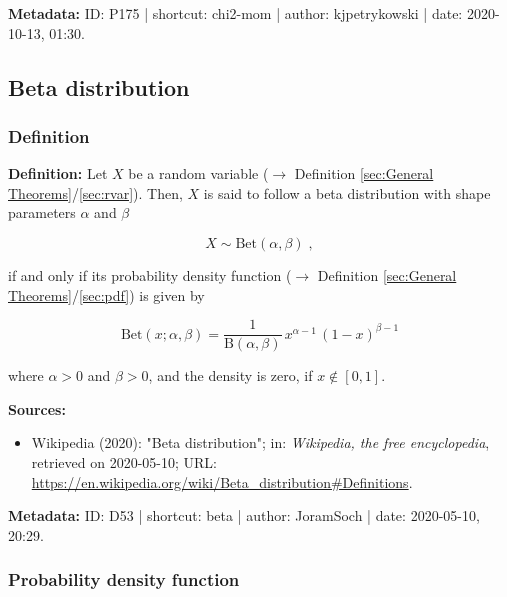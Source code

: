 \documentclass[a4paper,12pt,twoside]{book}
\begin{document}
\vspace{1em}
\textbf{Metadata:} ID: P175 | shortcut: chi2-mom | author: kjpetrykowski | date: 2020-10-13, 01:30.
\vspace{1em}



\subsection{Beta distribution}

\subsubsection[\textit{Definition}]{Definition} \label{sec:beta}
\setcounter{equation}{0}

\textbf{Definition:} Let $X$ be a random variable ($\rightarrow$ Definition \ref{sec:General Theorems}/\ref{sec:rvar}). Then, $X$ is said to follow a beta distribution with shape parameters $\alpha$ and $\beta$

\begin{equation} \label{eq:beta-beta}
X \sim \mathrm{Bet}(\alpha, \beta) \; ,
\end{equation}

if and only if its probability density function ($\rightarrow$ Definition \ref{sec:General Theorems}/\ref{sec:pdf}) is given by

\begin{equation} \label{eq:beta-beta-pdf}
\mathrm{Bet}(x; \alpha, \beta) = \frac{1}{\mathrm{B}(\alpha, \beta)} \, x^{\alpha-1} \, (1-x)^{\beta-1}
\end{equation}

where $\alpha > 0$ and $\beta > 0$, and the density is zero, if $x \notin [0,1]$.


\vspace{1em}
\textbf{Sources:}
\begin{itemize}
\item Wikipedia (2020): "Beta distribution"; in: \textit{Wikipedia, the free encyclopedia}, retrieved on 2020-05-10; URL: \url{https://en.wikipedia.org/wiki/Beta_distribution#Definitions}.
\end{itemize}


\vspace{1em}
\textbf{Metadata:} ID: D53 | shortcut: beta | author: JoramSoch | date: 2020-05-10, 20:29.
\vspace{1em}



\subsubsection[\textbf{Probability density function}]{Probability density function} \label{sec:beta-pdf}
\setcounter{equation}{0}
\end{document}
